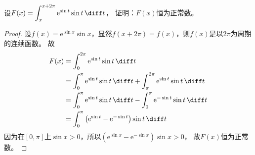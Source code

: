 \begin{example}
    设$\displaystyle F(x) = \int_x^{x+2\pi} \mathrm{e}^{\sin t}\sin t\,\diff t$，
    证明：$F(x)$恒为正常数。
\end{example}

\begin{proof}
    设$f(x)= \mathrm{e}^{\sin x}\sin x$，显然$f(x+2\pi) = f(x)$，则$f(x)$是以$2\pi$为周期的连续函数。
    故
    \begin{align}
        F(x) & = \int_0^{2\pi} \mathrm{e}^{\sin t}\sin t\,\diff t                                                     \\
             & = \int_0^{\pi}\mathrm{e}^{\sin t}\sin t\,\diff t + \int_{\pi}^{2\pi}\mathrm{e}^{\sin t}\sin t\,\diff t \\
             & = \int_0^{\pi}\mathrm{e}^{\sin t}\sin t\,\diff t - \int_0^{\pi}\mathrm{e}^{-\sin t}\sin t\,\diff t     \\
             & = \int_0^{\pi}\left(\mathrm{e}^{\sin t} - \mathrm{e}^{-\sin t}\right)\sin t\,\diff t                   \\
    \end{align}
    因为在$[0,\pi]$上$\sin x > 0$，所以$\left(\mathrm{e}^{\sin x} - \mathrm{e}^{-\sin x}\right)\sin x >0$，
    故$F(x)$恒为正常数。
\end{proof}

